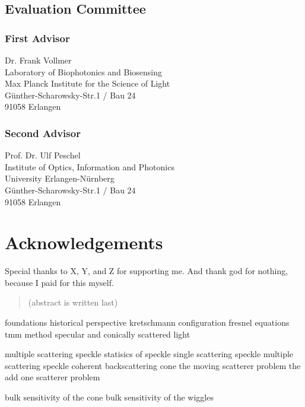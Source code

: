 \documentclass[a4paper]{report}
\begin{document}
\section*{Evaluation Committee}
\subsection*{First Advisor}
Dr. Frank Vollmer\\
Laboratory of Biophotonics and Biosensing\\
Max Planck Institute for the Science of Light\\
G\"unther-Scharowsky-Str.1 / Bau 24\\
91058 Erlangen
\subsection*{Second Advisor}
Prof. Dr. Ulf Peschel\\
Institute of Optics, Information and Photonics\\
University Erlangen-N\"urnberg\\
G\"unther-Scharowsky-Str.1 / Bau 24\\
91058 Erlangen

\newpage
\chapter*{Acknowledgements}
Special thanks to X, Y, and Z for supporting me.  And thank god for
nothing, because I paid for this myself.

\tableofcontents

\begin{abstract}
(abstract is written last)
\end{abstract}


foundations
 historical perspective
 kretschmann configuration
 fresnel equations
 tmm method
 specular and conically scattered light

multiple scattering
 speckle
  statisics of speckle
  single scattering speckle
  multiple scattering speckle
 coherent backscattering cone
 the moving scatterer problem
 the add one scatterer problem

bulk sensitivity of the cone
bulk sensitivity of the wiggles
\end{document}
